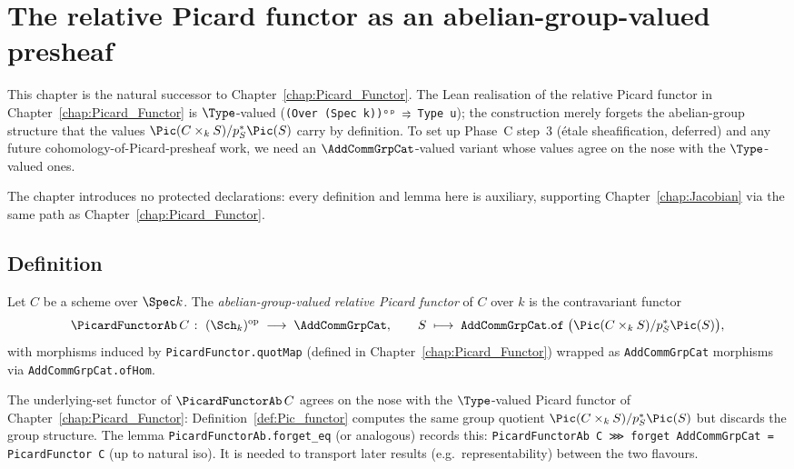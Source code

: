 \chapter{The relative Picard functor as an abelian-group-valued presheaf}
\label{chap:Picard_FunctorAb}

This chapter is the natural successor to Chapter~\ref{chap:Picard_Functor}. The Lean realisation of the relative Picard functor in Chapter~\ref{chap:Picard_Functor} is $\Type$-valued (\lstinline{(Over (Spec k))ᵒᵖ ⥤ Type u}); the construction merely forgets the abelian-group structure that the values $\Pic(C \times_k S) / p_S^*\Pic(S)$ carry by definition. To set up Phase~C step~3 (étale sheafification, deferred) and any future cohomology-of-Picard-presheaf work, we need an $\AddCommGrpCat$-valued variant whose values agree on the nose with the $\Type$-valued ones.

The chapter introduces no protected declarations: every definition and lemma here is auxiliary, supporting Chapter~\ref{chap:Jacobian} via the same path as Chapter~\ref{chap:Picard_Functor}.

\section{Definition}

\begin{definition}
  \label{def:Pic_functorAb}
  Let $C$ be a scheme over $\Spec k$. The \emph{abelian-group-valued relative Picard functor} of $C$ over $k$ is the contravariant functor
  \[
    \PicardFunctorAb\, C \;\colon\; (\Sch_k)^{\mathrm{op}} \;\longrightarrow\; \AddCommGrpCat,\qquad
    S \;\longmapsto\; \mathtt{AddCommGrpCat.of}\;\bigl(\Pic(C \times_k S) / p_S^*\Pic(S)\bigr),
  \]
  with morphisms induced by \lstinline{PicardFunctor.quotMap} (defined in Chapter~\ref{chap:Picard_Functor}) wrapped as \lstinline{AddCommGrpCat} morphisms via \lstinline{AddCommGrpCat.ofHom}.
\end{definition}

\begin{remark}
  The underlying-set functor of $\PicardFunctorAb\, C$ agrees on the nose with the $\Type$-valued Picard functor of Chapter~\ref{chap:Picard_Functor}: Definition~\ref{def:Pic_functor} computes the same group quotient $\Pic(C \times_k S) / p_S^*\Pic(S)$ but discards the group structure. The lemma \lstinline{PicardFunctorAb.forget_eq} (or analogous) records this: \lstinline{PicardFunctorAb C ⋙ forget AddCommGrpCat = PicardFunctor C} (up to natural iso). It is needed to transport later results (e.g.\ representability) between the two flavours.
\end{remark}


